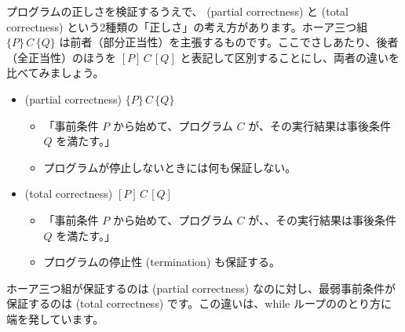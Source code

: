 \documentclass[
		head_space=20mm,
		foot_space=20mm,
		gutter=10mm,
		line_length=190mm
]{jlreq}
\begin{document}
プログラムの正しさを検証するうえで、 (partial correctness) と (total correctness) という2種類の「正しさ」の考え方があります。ホーア三つ組 $\{P\}\,C\,\{Q\}$ は前者（部分正当性）を主張するものです。ここでさしあたり、後者（全正当性）のほうを $[P]\,C\,[Q]$ と表記して区別することにし、両者の違いを比べてみましょう。
\begin{framed}
\begin{itemize}
	\item {} (partial correctness) \;$\{P\}\,C\,\{Q\}$
	\begin{itemize}
		\item[\circ~\;] 「事前条件 $P$ から始めて、プログラム $C$ が、その実行結果は事後条件 $Q$ を満たす。」
		\item[\circ~\;] プログラムが停止しないときには何も保証しない。
	\end{itemize}
	\item {} (total correctness) \;$[P]\,C\,[Q]$
	\begin{itemize}
		\item[\circ~\;] 「事前条件 $P$ から始めて、プログラム $C$ が、、その実行結果は事後条件 $Q$ を満たす。」
		\item[\circ~\;] プログラムの停止性 (termination) も保証する。
	\end{itemize}
\end{itemize}
\end{framed}
ホーア三つ組が保証するのは (partial correctness) なのに対し、最弱事前条件が保証するのは (total correctness) です。この違いは、while ループののとり方に端を発しています。\vspace{8pt}
\end{document}
